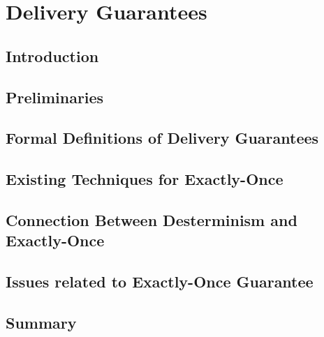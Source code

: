 \chapter{Delivery Guarantees}
\label{thesis-chapter-delivery-guarantees}

\section{Introduction}

\section{Preliminaries}

\section{Formal Definitions of Delivery Guarantees}

\section{Existing Techniques for Exactly-Once}

\section{Connection Between Desterminism and Exactly-Once}

\section{Issues related to Exactly-Once Guarantee}

\section{Summary}